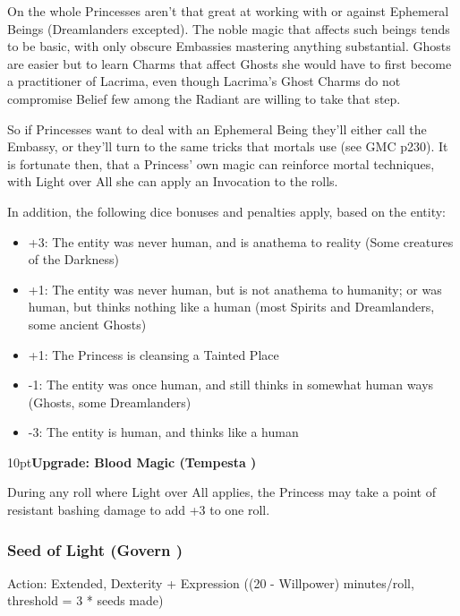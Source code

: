 On the whole Princesses aren't that great at working with or against Ephemeral Beings (Dreamlanders excepted). The noble magic that affects such beings tends to be basic, with only obscure Embassies mastering anything substantial. Ghosts are easier but to learn Charms that affect Ghosts she would have to first become a practitioner of Lacrima, even though Lacrima's Ghost Charms do not compromise Belief few among the Radiant are willing to take that step.

So if Princesses want to deal with an Ephemeral Being they'll either call the Embassy, or they'll turn to the same tricks that mortals use (see GMC p230). It is fortunate then, that a Princess' own magic can reinforce mortal techniques, with Light over All she can apply an Invocation to the rolls. 

In addition, the following dice bonuses and penalties apply, based on the entity:

\begin{itemize} \item    +3: The entity was never human, and is anathema to reality (Some creatures of the Darkness)
\item    +1: The entity was never human, but is not anathema to humanity; or was human, but thinks nothing like a human (most Spirits and Dreamlanders, some ancient Ghosts)
\item    +1: The Princess is cleansing a Tainted Place
\item    -1: The entity was once human, and still thinks in somewhat human ways (Ghosts, some Dreamlanders)
\item    -3: The entity is human, and thinks like a human
\end{itemize}

\begin{myindentpar}{10pt}\textbf{Upgrade: Blood Magic (Tempesta \textbullet)}

During any roll where Light over All applies, the Princess may take a point of resistant bashing damage to add +3 to one roll.\end{myindentpar}


\subsubsection*{Seed of Light (Govern \textbullet\textbullet)}

\noindent Action: Extended, Dexterity + Expression ((20 - Willpower) minutes/roll, threshold = 3 * seeds made)

